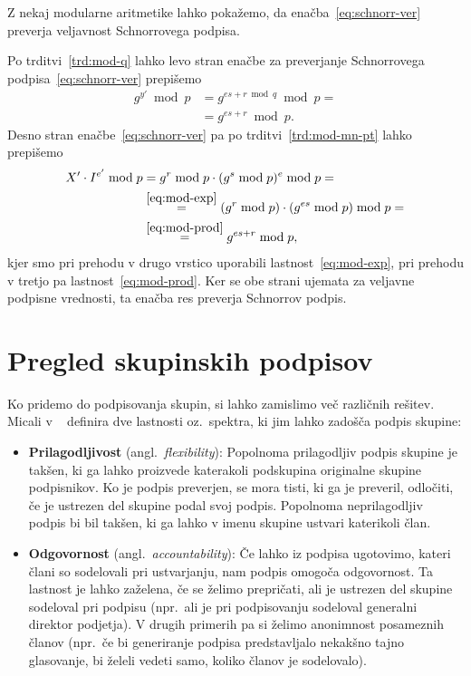 \documentclass[isrm2, tisk]{fmfdelo}
\begin{document}
Z nekaj modularne aritmetike lahko pokažemo, da enačba~\eqref{eq:schnorr-ver} preverja veljavnost
Schnorrovega podpisa.

Po trditvi~\ref{trd:mod-q} lahko levo stran enačbe za preverjanje Schnorrovega podpisa~\eqref{eq:schnorr-ver}
prepišemo
\begin{align*}
    g^{y'} \bmod p &= g^{es + r \bmod q} \bmod p = \\ 
                   &= g^{es + r} \bmod p. 
\end{align*}
Desno stran enačbe~\eqref{eq:schnorr-ver} pa po trditvi~\ref{trd:mod-mn-pt} lahko prepišemo
\begin{align*}
X' \cdot I^{e'} \bmod p &= g^r \bmod p \cdot (g^s \bmod p)^e \bmod p = \\
                        &\stackrel{\eqref{eq:mod-exp}}{=} (g^r \bmod p) \cdot (g^{es} \bmod p) \bmod p = \\ 
                        &\stackrel{\eqref{eq:mod-prod}}{=} g^{es + r} \bmod p,
\end{align*}
kjer smo pri prehodu v drugo vrstico uporabili lastnost~\eqref{eq:mod-exp}, pri prehodu v tretjo 
pa lastnost~\eqref{eq:mod-prod}. Ker se obe strani ujemata za veljavne podpisne vrednosti, ta enačba 
res preverja Schnorrov podpis.

\section{Pregled skupinskih podpisov}
\label{sec:skpine}
Ko pridemo do podpisovanja skupin, si lahko zamislimo več različnih rešitev. Micali v ~\cite{micali2001asm} 
definira dve lastnosti oz.\ spektra, ki jim lahko zadošča podpis skupine:
\begin{itemize}
    \item \textbf{Prilagodljivost} (angl.\ \textit{flexibility}): Popolnoma prilagodljiv podpis skupine
        je takšen, ki ga lahko proizvede katerakoli podskupina originalne skupine podpisnikov. Ko je podpis 
        preverjen, se mora tisti, ki ga je preveril, odločiti, če je ustrezen del skupine podal svoj podpis. 
        Popolnoma neprilagodljiv podpis bi bil takšen, ki ga lahko v imenu skupine ustvari katerikoli član.
    \item \textbf{Odgovornost} (angl.\ \textit{accountability}): Če lahko iz podpisa ugotovimo, kateri člani 
        so sodelovali pri ustvarjanju, nam podpis omogoča odgovornost. Ta lastnost je lahko zaželena, če 
        se želimo prepričati, ali je ustrezen del skupine sodeloval pri podpisu (npr.\ ali je pri podpisovanju 
        sodeloval generalni direktor podjetja). V drugih primerih pa si želimo anonimnost posameznih članov 
        (npr.\ če bi generiranje podpisa predstavljalo nekakšno tajno glasovanje, bi želeli vedeti samo, koliko 
        članov je sodelovalo).
\end{itemize}
\end{document}
